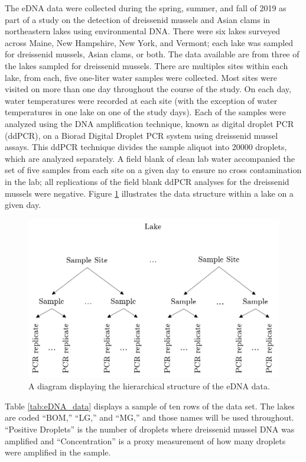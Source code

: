 \documentclass[12pt]{article}\usepackage[]{graphicx}\usepackage[]{color}
\begin{document}
The eDNA data were collected during the spring, summer, and fall of 2019 as part of a study on the detection of dreissenid mussels and Asian clams in northeastern lakes using environmental DNA. There were six lakes surveyed across Maine, New Hampshire, New York, and Vermont; each lake was sampled for dreissenid mussels, Asian clams, or both. The data available are from three of the lakes sampled for dreissenid mussels. There are multiples sites within each lake, from each, five one-liter water samples were collected. Most sites were visited on more than one day throughout the course of the study. On each day, water temperatures were recorded at each site (with the exception of water temperatures in one lake on one of the study days). Each of the samples were analyzed using the DNA amplification technique, known as digital droplet PCR (ddPCR), on a Biorad Digital Droplet PCR system using dreissenid mussel assays. This ddPCR technique divides the sample aliquot into 20000 droplets, which are analyzed separately. A field blank of clean lab water accompanied the set of five samples from each site on a given day to ensure no cross contamination in the lab; all replications of the field blank ddPCR analyses for the dreissenid mussels were negative. Figure \ref{fig:eDNA_diagram} illustrates the data structure within a lake on a given day. 

\begin{figure}[]
	\centering
	\includegraphics[scale = 0.7]{eDNA}
	\caption{A diagram displaying the hierarchical structure of the eDNA data.}
	\label{fig:eDNA_diagram}
\end{figure}

Table \ref{tab:eDNA_data} displays a sample of ten rows of the data set. The lakes are coded ``BOM,'' ``LG,'' and ``MG,'' and those names will be used throughout. ``Positive Droplets'' is the number of droplets where dreissenid mussel DNA was amplified and ``Concentration'' is a proxy measurement of how many droplets were amplified in the sample. 
\end{document}
